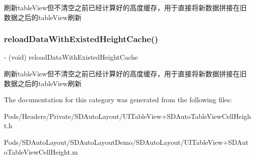 刷新table\+View但不清空之前已经计算好的高度缓存，用于直接将新数据拼接在旧数据之后的table\+View刷新 \mbox{\label{category_u_i_table_view_07_s_d_auto_table_view_cell_height_08_aa214f77cb8d7d846e36c86db5710d844}} 
\subsubsection{\texorpdfstring{reload\+Data\+With\+Existed\+Height\+Cache()}{reloadDataWithExistedHeightCache()}\hspace{0.1cm}{\footnotesize\ttfamily [3/3]}}
{\footnotesize\ttfamily -\/ (void) reload\+Data\+With\+Existed\+Height\+Cache \begin{DoxyParamCaption}{ }\end{DoxyParamCaption}}

刷新table\+View但不清空之前已经计算好的高度缓存，用于直接将新数据拼接在旧数据之后的table\+View刷新 

The documentation for this category was generated from the following files\+:\begin{DoxyCompactItemize}
\item 
Pods/\+Headers/\+Private/\+S\+D\+Auto\+Layout/U\+I\+Table\+View+\+S\+D\+Auto\+Table\+View\+Cell\+Height.\+h\item 
Pods/\+S\+D\+Auto\+Layout/\+S\+D\+Auto\+Layout\+Demo/\+S\+D\+Auto\+Layout/U\+I\+Table\+View+\+S\+D\+Auto\+Table\+View\+Cell\+Height.\+m\end{DoxyCompactItemize}
